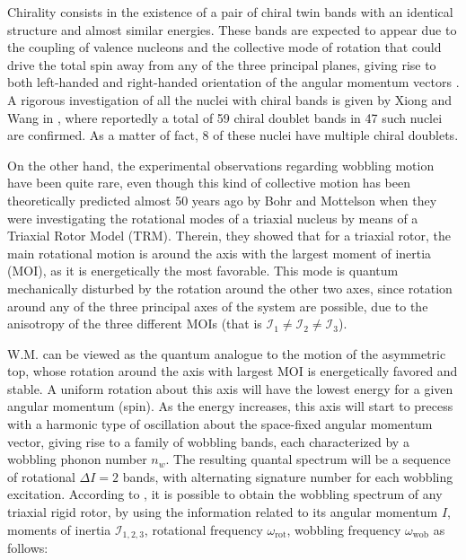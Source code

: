 \documentclass[11pt]{article}
\begin{document}
Chirality consists in the existence of a pair of chiral twin bands with an identical structure and almost similar energies. These bands are expected to appear due to the coupling of valence nucleons and the collective mode of rotation that could drive the total spin away from any of the three principal planes, giving rise to both left-handed and right-handed orientation of the angular momentum vectors \cite{frauendorf1997tilted}. A rigorous investigation of all the nuclei with chiral bands is given by Xiong and Wang in \cite{xiong2019nuclear}, where reportedly a total of 59 chiral doublet bands in 47 such nuclei are confirmed. As a matter of fact, 8 of these nuclei have multiple chiral doublets. 

On the other hand, the experimental observations regarding wobbling motion have been quite rare, even though this kind of collective motion has been theoretically predicted almost 50 years ago by Bohr and Mottelson \cite{bohr1998nuclear} when they were investigating the rotational modes of a triaxial nucleus by means of a Triaxial Rotor Model (TRM). Therein, they showed that for a triaxial rotor, the main rotational motion is around the axis with the largest moment of inertia (MOI), as it is energetically the most favorable. This mode is quantum mechanically disturbed by the rotation around the other two axes, since rotation around any of the three principal axes of the system are possible, due to the anisotropy of the three different MOIs (that is $\mathcal{I}_1\neq\mathcal{I}_2\neq\mathcal{I}_3$).

W.M. can be viewed as the quantum analogue to the motion of the asymmetric top, whose rotation around the axis with largest MOI is energetically favored and stable. A uniform rotation about this axis will have the lowest energy for a given angular momentum (spin). As the energy increases, this axis will start to precess with a harmonic type of oscillation about the space-fixed angular momentum vector, giving rise to a family of wobbling bands, each characterized by a wobbling phonon number $n_w$. The resulting quantal spectrum will be a sequence of rotational $\Delta I=2$ bands, with alternating signature number for each wobbling excitation. According to \cite{bohr1998nuclear}, it is possible to obtain the wobbling spectrum of any triaxial rigid rotor, by using the information related to its angular momentum $I$, moments of inertia $\mathcal{I}_{1,2,3}$, rotational frequency $\omega_\text{rot}$, wobbling frequency $\omega_\text{wob}$ as follows:
\end{document}
